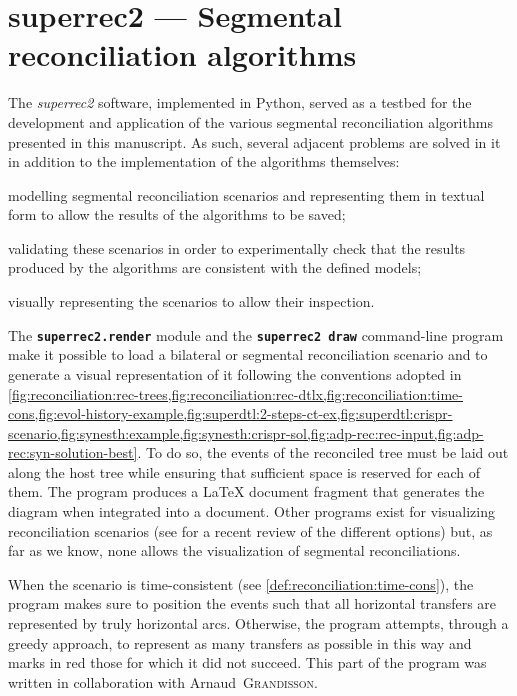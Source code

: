 \section{superrec2 --- Segmental reconciliation algorithms}\label{sec:logiciel:superrec2}

The \emph{superrec2} software, implemented in Python, served as a testbed for the development and application of the various segmental reconciliation algorithms presented in this manuscript.
As such, several adjacent problems are solved in it in addition to the implementation of the algorithms themselves:

\begin{compactitemize}
    \item modelling segmental reconciliation scenarios and representing them in textual form to allow the results of the algorithms to be saved;
    \item validating these scenarios in order to experimentally check that the results produced by the algorithms are consistent with the defined models;
    \item visually representing the scenarios to allow their inspection.
\end{compactitemize}

The \textbf{\texttt{superrec2.render}} module and the \textbf{\texttt{superrec2 draw}} command-line program make it possible to load a bilateral or segmental reconciliation scenario and to generate a visual representation of it following the conventions adopted in \cref{fig:reconciliation:rec-trees,fig:reconciliation:rec-dtlx,fig:reconciliation:time-cons,fig:evol-history-example,fig:superdtl:2-steps-ct-ex,fig:superdtl:crispr-scenario,fig:synesth:example,fig:synesth:crispr-sol,fig:adp-rec:rec-input,fig:adp-rec:syn-solution-best}.
To do so, the events of the reconciled tree must be laid out along the host tree while ensuring that sufficient space is reserved for each of them.
The program produces a {\LaTeX} document fragment that generates the diagram when integrated into a document.
Other programs exist for visualizing reconciliation scenarios (see \cite{Menet2022PhylogeneticReconciliation} for a recent review of the different options) but, as far as we know, none allows the visualization of segmental reconciliations.

When the scenario is time-consistent (see \cref{def:reconciliation:time-cons}), the program makes sure to position the events such that all horizontal transfers are represented by truly horizontal arcs.
Otherwise, the program attempts, through a greedy approach, to represent as many transfers as possible in this way and marks in red those for which it did not succeed.
This part of the program was written in collaboration with Arnaud~\textsc{Grandisson}.

